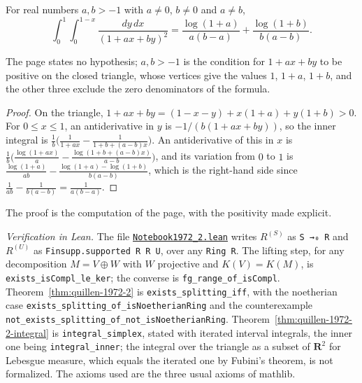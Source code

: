 \begin{encadre}
\begin{theoreme}\label{thm:quillen-1972-2-integral}
For real numbers $a, b > -1$ with $a \ne 0$, $b \ne 0$ and $a \ne b$,
\[
\int_0^1 \!\! \int_0^{1-x} \frac{dy\,dx}{(1 + ax + by)^2} = \frac{\log(1+a)}{a(b-a)} + \frac{\log(1+b)}{b(a-b)}.
\]
\end{theoreme}
\end{encadre}

\noindent The page states no hypothesis; $a, b > -1$ is the condition for $1 + ax + by$ to be positive on the closed triangle, whose vertices give the values $1$, $1 + a$, $1 + b$, and the other three exclude the zero denominators of the formula.

\begin{proof}
On the triangle, $1 + ax + by = (1 - x - y) + x(1 + a) + y(1 + b) > 0$. For $0 \le x \le 1$, an antiderivative in $y$ is $-1/(b(1 + ax + by))$, so the inner integral is $\frac1b\bigl(\frac{1}{1+ax} - \frac{1}{1 + b + (a-b)x}\bigr)$. An antiderivative of this in $x$ is $\frac1b\bigl(\frac{\log(1+ax)}{a} - \frac{\log(1 + b + (a-b)x)}{a-b}\bigr)$, and its variation from $0$ to $1$ is $\frac{\log(1+a)}{ab} - \frac{\log(1+a) - \log(1+b)}{b(a-b)}$, which is the right-hand side since $\frac{1}{ab} - \frac{1}{b(a-b)} = \frac{1}{a(b-a)}$.
\end{proof}

\noindent The proof is the computation of the page, with the positivity made explicit.

\emph{Verification in Lean.} The file \href{\leanblobmain/Notebook1972_2.lean}{\texttt{Notebook1972\_2.\allowbreak{}lean}} writes $R^{(S)}$ as \texttt{S →₀ R} and $R^{(U)}$ as \texttt{Finsupp.supported R R U}, over any \texttt{Ring R}. The lifting step, for any decomposition $M = V \oplus W$ with $W$ projective and $K(V) = K(M)$, is \texttt{exists\_isCompl\_le\_ker}; the converse is \texttt{fg\_range\_of\_isCompl}. Theorem~\ref{thm:quillen-1972-2} is \texttt{exists\_splitting\_iff}, with the noetherian case \texttt{exists\_splitting\_of\_isNoetherianRing} and the counterexample \texttt{not\_exists\_splitting\_of\_not\_isNoetherianRing}. Theorem~\ref{thm:quillen-1972-2-integral} is \texttt{integral\_simplex}, stated with iterated interval integrals, the inner one being \texttt{integral\_inner}; the integral over the triangle as a subset of $\mathbf R^2$ for Lebesgue measure, which equals the iterated one by Fubini's theorem, is not formalized. The axioms used are the three usual axioms of mathlib.

